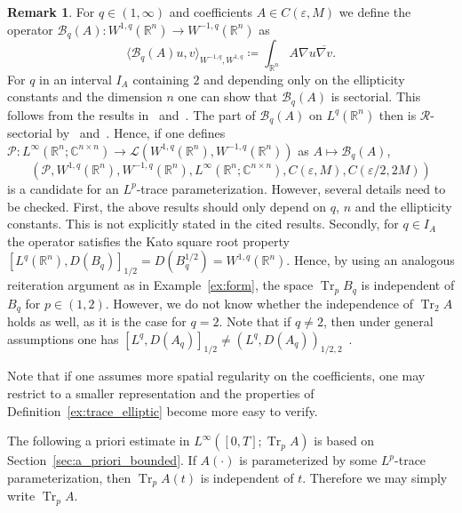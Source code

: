 \documentclass[reqno,a4paper,final]{amsart}
\numberwithin{equation}{section}
\theoremstyle{definition}
\newtheorem{remark}[lemma]{Remark}
\begin{document}
	 \begin{remark}
	 	For $q \in (1, \infty)$ and coefficients $A \in C({\varepsilon},M)$ we define the operator $\mathcal{B}_q(A)\colon W^{1,q}({\mathbb{R}}^n) \to W^{-1,q}({\mathbb{R}}^n)$ as
		\begin{equation*}
			\langle \mathcal{B}_q(A) u, v \rangle_{W^{-1,q},W^{1,q}} \coloneqq \int_{{\mathbb{R}}^n} A \nabla u \overline{\nabla v}.
		\end{equation*}
		For $q$ in an interval $I_A$ containing $2$ and depending only on the ellipticity constants and the dimension $n$ one can show that $\mathcal{B}_q(A)$ is sectorial. This follows from the results in~\cite[Section~4]{Aus07} and~\cite[Section~6]{DisElsReh16}. The part of $\mathcal{B}_q(A)$ on $L^q({\mathbb{R}}^n)$ then is $\mathcal{R}$-sectorial by~\cite[Theorem~5.1]{Aus07} and~\cite[Theorem~5.3]{KalWei01}. Hence, if one defines $\mathcal{P}\colon L^{\infty}({\mathbb{R}}^n; {\mathbb{C}}^{n \times n}) \to \mathcal{L}(W^{1,q}({\mathbb{R}}^n), W^{-1,q}({\mathbb{R}}^n))$ as $A \mapsto \mathcal{B}_q(A)$,
		\begin{equation*}
			(\mathcal{P},W^{1,q}({\mathbb{R}}^n),W^{-1,q}({\mathbb{R}}^n),L^{\infty}({\mathbb{R}}^n;{\mathbb{C}}^{n \times n}), C({\varepsilon}, M), C({\varepsilon}/2, 2M))
		\end{equation*}
		is a candidate for an $L^p$-trace parameterization. However, several details need to be checked. First, the above results should only depend on $q$, $n$ and the ellipticity constants. This is not explicitly stated in the cited results. Secondly, for $q \in I_A$ the operator satisfies the Kato square root property $[L^q({\mathbb{R}}^n),D(B_q)]_{1/2} = D(B_q^{1/2}) = W^{1,q}({\mathbb{R}}^n)$. Hence, by using an analogous reiteration argument as in Example~\ref{ex:form}, the space $\operatorname{Tr}_p B_q$ is independent of $B_q$ for $p \in (1,2)$. However, we do not know whether the independence of $\operatorname{Tr}_2 A$ holds as well, as it is the case for $q = 2$. Note that if $q \neq 2$, then under general assumptions one has $[L^q,D(A_q)]_{1/2} \neq (L^q,D(A_q))_{1/2,2}$~\cite[Corollary~3.2]{KucWei05}.
		
		Note that if one assumes more spatial regularity on the coefficients, one may restrict to a smaller representation and the properties of Definition~\ref{ex:trace_elliptic} become more easy to verify.	 
	\end{remark}
	 
	 
	 The following a priori estimate in $L^{\infty}([0,T];\operatorname{Tr}_p A)$ is based on Section~\ref{sec:a_priori_bounded}. If $A(\cdot)$ is parameterized by some $L^p$-trace parameterization, then $\operatorname{Tr}_p A(t)$ is independent of $t$. Therefore we may simply write $\operatorname{Tr}_p A$.
	
\end{document}
